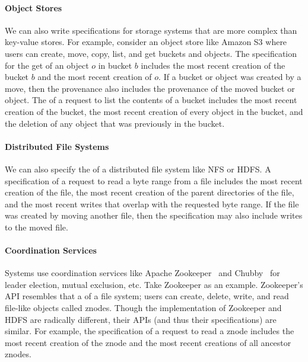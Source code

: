 \paragraph{Object Stores}
We can also write \watprovenance{} specifications for storage systems that are
more complex than key-value stores. For example, consider an object store like
Amazon S3 where users can create, move, copy, list, and get buckets and
objects. The \watprovenance{} specification for the get of an object $o$ in
bucket $b$ includes the most recent creation of the bucket $b$ and the most
recent creation of $o$. If a bucket or object was created by a move, then the
provenance also includes the provenance of the moved bucket or object. The
\watprovenance{} of a request to list the contents of a bucket includes the
most recent creation of the bucket, the most recent creation of every object in
the bucket, and the deletion of any object that was previously in the bucket.

\paragraph{Distributed File Systems}
We can also specify the \watprovenance{} of a distributed file system like NFS
or HDFS. A \watprovenance{} specification of a request to read a byte range
from a file includes the most recent creation of the file, the most recent
creation of the parent directories of the file, and the most recent writes that
overlap with the requested byte range. If the file was created by moving
another file, then the \watprovenance{} specification  may also include writes
to the moved file.

\paragraph{Coordination Services}
Systems use coordination services like Apache
Zookeeper~\cite{hunt2010zookeeper} and Chubby~\cite{burrows2006chubby} for
leader election, mutual exclusion, etc. Take Zookeeper as an example.
Zookeeper's API resembles that a of a file system; users can create, delete,
write, and read file-like objects called znodes. Though the implementation of
Zookeeper and HDFS are radically different, their APIs (and thus their
\watprovenance{} specifications) are similar. For example, the \watprovenance{}
specification of a request to read a znode includes the most recent creation of
the znode and the most recent creations of all ancestor znodes.

